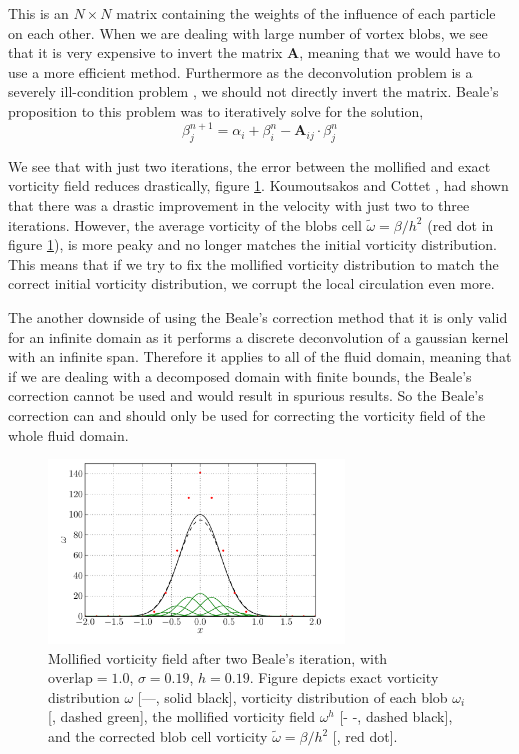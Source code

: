 This is an $N \times N$ matrix containing the weights of the influence of each particle on each other. When we are dealing with large number of vortex blobs, we see that it is very expensive to invert the matrix $\mathbf{A}$, meaning that we would have to use a more efficient method. Furthermore as the deconvolution problem is a severely ill-condition problem \cite{Cottet2000a}, we should not directly invert the matrix. Beale's proposition to this problem was to iteratively solve for the solution,
	\begin{equation}
	\beta_{j}^{n+1} = \alpha_i + \beta_i^n - \mathbf{A}_{ij}\cdot\beta_j^n
	\end{equation}
	
We see that with just two iterations, the error between the mollified and exact vorticity field reduces drastically, figure \ref{fig:bealesCorrection}. Koumoutsakos and Cottet \cite{Cottet2000a}, had shown that there was a drastic improvement in the velocity with just two to three iterations. However, the average vorticity of the blobs cell $\tilde{\omega} = \beta/h^2$ (red dot in figure \ref{fig:bealesCorrection}), is more peaky and no longer matches the initial vorticity distribution. This means that if we try to fix the mollified vorticity distribution to match the correct initial vorticity distribution, we corrupt the local circulation even more.

The another downside of using the Beale's correction method that it is only valid for an infinite domain as it performs a discrete deconvolution of a gaussian kernel with an infinite span. Therefore it applies to all of the fluid domain, meaning that if we are dealing with a decomposed domain with finite bounds, the Beale's correction cannot be used and would result in spurious results. So the Beale's correction can and should only be used for correcting the vorticity field of the whole fluid domain.

	\begin{figure}[t]
	\centering
	\includegraphics[width=0.7\textwidth]{figures/lagrangian/bealesCorrection.pdf}
	\caption{Mollified vorticity field after two Beale's iteration, with $\mathrm{overlap}=1.0$, $\sigma=0.19$, $h=0.19$. Figure depicts exact vorticity distribution $\omega$ [---, solid black], vorticity distribution of each blob $\omega_i$ [{\color{plotGreen}{---}}, dashed green], the mollified vorticity field $\omega^h$ [- -, dashed black], and the corrected blob cell vorticity $\tilde{\omega}=\beta/h^2$ [{\color{plotRed}{$\bullet$}}, red dot].}
	\label{fig:bealesCorrection}
	\end{figure}

